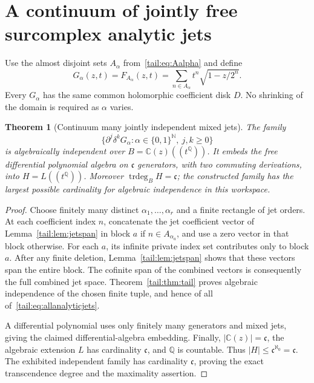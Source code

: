 \documentclass[11pt,a4paper]{article}
\numberwithin{equation}{section}
\newtheorem{theorem}{Theorem}[section]
\theoremstyle{definition}
\theoremstyle{remark}
\newcommand{\C}{\mathbb C}
\newcommand{\Q}{\mathbb Q}
\newcommand{\N}{\mathbb N}
\newcommand{\trdeg}{\operatorname{trdeg}}
\newcommand{\EDer}{\delta}
\newcommand{\cf}{\mathfrak c}
\begin{document}
\section{A continuum of jointly free surcomplex analytic jets}\label{tail:sec:analyticcontinuum}

Use the almost disjoint sets $A_\alpha$ from~\eqref{tail:eq:Aalpha} and define
\[
 G_\alpha(z,t)=F_{A_\alpha}(z,t)
       =\sum_{n\in A_\alpha}t^n\sqrt{1-z/2^n}.
\]
Every $G_\alpha$ has the same common holomorphic coefficient disk $D$.
No shrinking of the domain is required as $\alpha$ varies.

\begin{theorem}[Continuum many jointly independent mixed jets]
\label{tail:thm:continuumanalytic}
The family
\begin{equation}\label{tail:eq:allanalyticjets}
 \{\partial^j\EDer^kG_\alpha:
       \alpha\in\{0,1\}^{\N},\ j,k\geq0\}
\end{equation}
is algebraically independent over $B=\C(z)((t^\Q))$.
It embeds the free differential polynomial algebra on $\cf$ generators,
with two commuting derivations, into $H=L((t^\Q))$.
Moreover $\trdeg_B H=\cf$; the constructed family has the largest
possible cardinality for algebraic independence in this workspace.
\end{theorem}
\begin{proof}
Choose finitely many distinct $\alpha_1,\ldots,\alpha_r$ and a finite
rectangle of jet orders. At each coefficient index $n$, concatenate the
jet coefficient vector of Lemma~\ref{tail:lem:jetspan} in block $a$ if
$n\in A_{\alpha_a}$, and use a zero vector in that block otherwise.
For each $a$, its infinite private index set contributes only to block
$a$. After any finite deletion, Lemma~\ref{tail:lem:jetspan} shows that these
vectors span the entire block. The cofinite span of the combined vectors
is consequently the full combined jet space. Theorem~\ref{tail:thm:tail}
proves algebraic independence of the chosen finite tuple, and hence of
all of~\eqref{tail:eq:allanalyticjets}.

A differential polynomial uses only finitely many generators and mixed
jets, giving the claimed differential-algebra embedding. Finally,
$|\C(z)|=\cf$, the algebraic extension $L$ has cardinality $\cf$, and
$\Q$ is countable. Thus $|H|\leq\cf^{\aleph_0}=\cf$. The exhibited
independent family has cardinality $\cf$, proving the exact
transcendence degree and the maximality assertion.
\end{proof}
\end{document}
